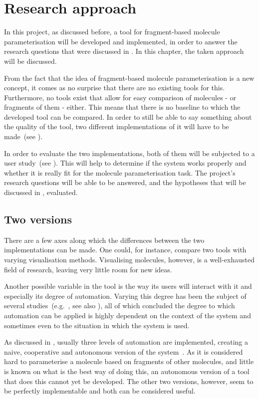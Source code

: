 \chapter{Research approach}

In this project, as discussed before, a tool for fragment-based molecule parameterisation will be developed and implemented, in order to answer the research questions that were discussed in . In this chapter, the taken approach will be discussed. 

From the fact that the idea of fragment-based molecule parameterisation is a new concept, it comes as no surprise that there are no existing tools for this. Furthermore, no tools exist that allow for easy comparison of molecules - or fragments of them - either. This means that there is no baseline to which the developed tool can be compared. In order to still be able to say something about the quality of the tool, two different implementations of it will have to be made~(see ).

In order to evaluate the two implementations, both of them will be subjected to a user study~(see ). This will help to determine if the system works properly and whether it is really fit for the molecule parameterisation task. The project's research questions will be able to be answered, and the hypotheses that will be discussed in , evaluated.


\section{Two versions}
There are a few axes along which the differences between the two implementations can be made. One could, for instance, compare two tools with varying visualisation methods. Visualising molecules, however, is a well-exhausted field of research, leaving very little room for new ideas.

Another possible variable in the tool is the way its users will interact with it and especially its degree of automation. Varying this degree has been the subject of several studies~(e.g.~\cite{payne2000varying, horvitz1999principles, marcus1987taking, norman1990problem}, see also ), all of which concluded the degree to which automation can be applied is highly dependent on the context of the system and sometimes even to the situation in which the system is used.

As discussed in , usually three levels of automation are implemented, creating a naive, cooperative and autonomous version of the system~\cite{payne2000varying}. As it is considered hard to parameterise a molecule based on fragments of other molecules, and little is known on what is the best way of doing this, an autonomous version of a tool that does this cannot yet be developed. The other two versions, however, seem to be perfectly implementable and both can be considered useful.

